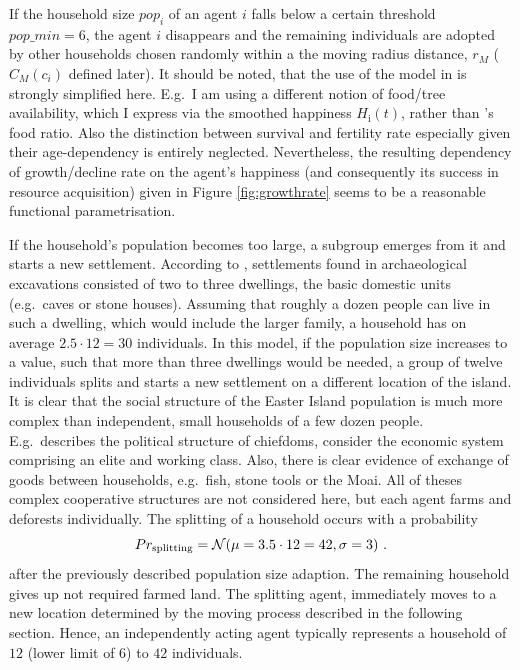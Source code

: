 If the household size $pop_i$ of an agent $i$ falls below a certain threshold 
$pop\_min = 6$, the agent $i$ disappears and the remaining individuals are adopted by other households chosen randomly within a the moving radius distance, $r_M$ ($C_M(c_i)$ defined later).
It should be noted, that the use of the model in \citet{Pulestion2017} is strongly simplified here.
E.g.\ I am using a different notion of food/tree availability, which I express via the smoothed happiness $H_\text{i}(t)$, rather than \citet{Puleston2017}'s food ratio.
Also the distinction between survival and fertility rate especially given their age-dependency is entirely neglected.
Nevertheless, the resulting dependency of growth/decline rate on the agent's happiness (and consequently its success in resource acquisition) given in Figure \ref{fig:growthrate} seems to be a reasonable functional parametrisation. 


If the household's population becomes too large, a subgroup emerges from it and starts a new settlement.
According to \citet{Bahn2017}, settlements found in archaeological excavations consisted of two to three dwellings, the basic domestic units (e.g.\ caves or stone houses). 
Assuming that roughly a dozen people can live in such a dwelling, which would include the larger family, a household has on average $2.5\cdot 12 = 30$ individuals.
In this model, if the population size increases to a value, such that more than three dwellings would be needed, a group of twelve individuals splits and starts a new settlement on a different location of the island. 
It is clear that the social structure of the Easter Island population is much more complex than independent, small households of a few dozen people. 
E.g.\ \citet{Cauwe2011}\TODO describes the political structure of chiefdoms, \citet{Puleston2017} consider the economic system comprising an elite and working class.
Also, there is clear evidence of exchange of goods between households, e.g.\ fish, stone tools or the Moai.
All of theses complex cooperative structures are not considered here, but each agent farms and deforests individually.
The splitting of a household occurs with a probability 
\begin{equation}
Pr_{\rm splitting} = \mathcal{N}( \mu = 3.5 \cdot 12 = 42, \sigma = 3)\ .
\end{equation}
after the previously described population size adaption.
The remaining household gives up not required farmed land.
The splitting agent, immediately moves to a new location determined by the moving process described in the following section.
Hence, an independently acting agent typically represents a household of $12$ (lower limit of $6$) to $42$ individuals.

